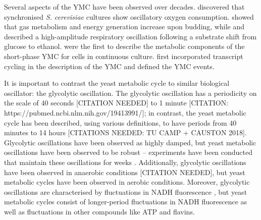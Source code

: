 Several aspects of the YMC have been observed over decades.
\citet{nosohSYNCHRONIZATIONBUDDINGCYCLE1962} discovered that synchronised \emph{S. cerevisiae} cultures show oscillatory oxygen consumption.
\citet{kasparvonmeyenburgEnergeticsBuddingCycle1969} showed that gas metabolism and energy generation increase upon budding, while and \citet{mochanRespiratoryOscillationsAdapting1973} described a high-amplitude respiratory oscillation following a substrate shift from glucose to ethanol.
\citet{satroutdinovOscillatoryMetabolismSaccharomyces1992} were the first to describe the metabolic components of the short-phase YMC for cells in continuous culture.
\citet{tuLogicYeastMetabolic2005} first incorporated transcript cycling in the description of the YMC and defined the YMC events.

It is important to contrast the yeast metabolic cycle to similar biological oscillator: the glycolytic oscillation.
The glycolytic oscillation has a periodicity on the scale of 40 seconds [CITATION NEEDED] to 1 minute [CITATION: https://pubmed.ncbi.nlm.nih.gov/19413991/]; in contrast, the yeast metabolic cycle has been described, using various definitions, to have periods from 40 minutes to 14 hours [CITATIONS NEEDED: TU CAMP + CAUSTON 2018].
Glycolytic oscillations have been observed as highly damped, but yeast metabolic oscillations have been observed to be robust -- experiments have been conducted that maintain these oscillations for weeks \parencite{lloydRedoxRhythmicityClocks2007}.
Additionally, glycolytic oscillations have been observed in anaerobic conditions [CITATION NEEDED], but yeast metabolic cycles have been observed in aerobic conditions.
Moreover, glycolytic oscillations are characterised by fluctuations in NADH fluorescence \citep{lloydSaccharomycesCerevisiaeOscillatory2019}, but yeast metabolic cycles consist of longer-period fluctuations in NADH fluorescence as well as fluctuations in other compounds like ATP and flavins.

